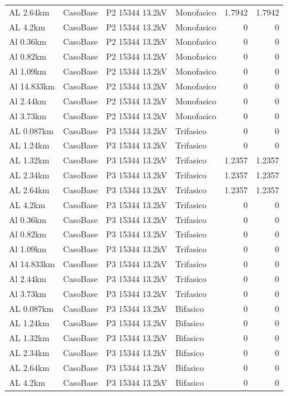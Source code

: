 \documentclass[11pt,a4paper]{article}
\begin{document}
\begin{longtable}{llllrr}
AL 2.64km & CasoBase & P2 15344 13.2kV & Monofasico & 1.7942 & 1.7942 \\
AL 4.2km & CasoBase & P2 15344 13.2kV & Monofasico & 0 & 0 \\
Al 0.36km & CasoBase & P2 15344 13.2kV & Monofasico & 0 & 0 \\
Al 0.82km & CasoBase & P2 15344 13.2kV & Monofasico & 0 & 0 \\
Al 1.09km & CasoBase & P2 15344 13.2kV & Monofasico & 0 & 0 \\
Al 14.833km & CasoBase & P2 15344 13.2kV & Monofasico & 0 & 0 \\
Al 2.44km & CasoBase & P2 15344 13.2kV & Monofasico & 0 & 0 \\
Al 3.73km & CasoBase & P2 15344 13.2kV & Monofasico & 0 & 0 \\
AL 0.087km & CasoBase & P3 15344 13.2kV & Trifasico & 0 & 0 \\
AL 1.24km & CasoBase & P3 15344 13.2kV & Trifasico & 0 & 0 \\
AL 1.32km & CasoBase & P3 15344 13.2kV & Trifasico & 1.2357 & 1.2357 \\
AL 2.34km & CasoBase & P3 15344 13.2kV & Trifasico & 1.2357 & 1.2357 \\
AL 2.64km & CasoBase & P3 15344 13.2kV & Trifasico & 1.2357 & 1.2357 \\
AL 4.2km & CasoBase & P3 15344 13.2kV & Trifasico & 0 & 0 \\
Al 0.36km & CasoBase & P3 15344 13.2kV & Trifasico & 0 & 0 \\
Al 0.82km & CasoBase & P3 15344 13.2kV & Trifasico & 0 & 0 \\
Al 1.09km & CasoBase & P3 15344 13.2kV & Trifasico & 0 & 0 \\
Al 14.833km & CasoBase & P3 15344 13.2kV & Trifasico & 0 & 0 \\
Al 2.44km & CasoBase & P3 15344 13.2kV & Trifasico & 0 & 0 \\
Al 3.73km & CasoBase & P3 15344 13.2kV & Trifasico & 0 & 0 \\
AL 0.087km & CasoBase & P3 15344 13.2kV & Bifasico & 0 & 0 \\
AL 1.24km & CasoBase & P3 15344 13.2kV & Bifasico & 0 & 0 \\
AL 1.32km & CasoBase & P3 15344 13.2kV & Bifasico & 0 & 0 \\
AL 2.34km & CasoBase & P3 15344 13.2kV & Bifasico & 0 & 0 \\
AL 2.64km & CasoBase & P3 15344 13.2kV & Bifasico & 0 & 0 \\
AL 4.2km & CasoBase & P3 15344 13.2kV & Bifasico & 0 & 0 \\

\end{longtable}
\end{document}
